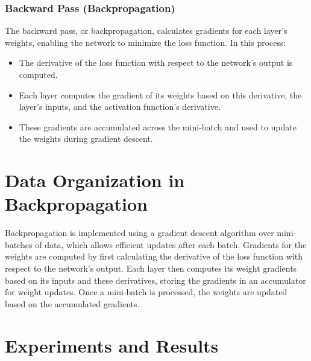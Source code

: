 \documentclass{article}
\begin{document}
\subsubsection{Backward Pass (Backpropagation)}
The backward pass, or backpropagation, calculates gradients for each layer’s weights, enabling the network to minimize the loss function. In this process:
\begin{itemize}
    \item The derivative of the loss function with respect to the network's output is computed.
    \item Each layer computes the gradient of its weights based on this derivative, the layer's inputs, and the activation function's derivative.
    \item These gradients are accumulated across the mini-batch and used to update the weights during gradient descent.
\end{itemize}

\section{Data Organization in Backpropagation}

Backpropagation is implemented using a gradient descent algorithm over mini-batches of data, which allows efficient updates after each batch. Gradients for the weights are computed by first calculating the derivative of the loss function with respect to the network’s output. Each layer then computes its weight gradients based on its inputs and these derivatives, storing the gradients in an accumulator for weight updates. Once a mini-batch is processed, the weights are updated based on the accumulated gradients.

\section{Experiments and Results}
\end{document}

